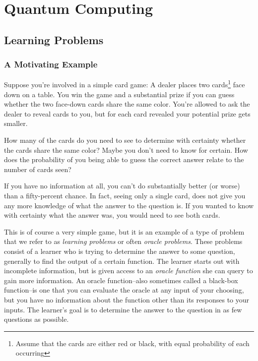 \chapter{Quantum Computing}

\section{Learning Problems}

\subsection{A Motivating Example}


        Suppose you're involved in a simple card game: A dealer places two cards\footnote{Assume that the cards are
        either red or black, with equal probability of each occurring}  face down on a table. You win the game and a
        substantial prize if you can guess whether the two face-down cards share the same color. You're allowed to
        ask the dealer to reveal cards to you, but for each card revealed your potential prize gets smaller.

        How many of the cards do you need to see to determine with certainty whether the cards share the same
        color?  Maybe you don't need to know for certain. How does the probability of you being able to guess the
        correct answer relate to the number of cards seen?


        If you have no information at all, you can't do substantially better (or worse) than a fifty-percent
        chance. In fact, seeing only a single card, does not give you any more knowledge of what the answer to the
        question is. If you wanted to know with certainty what the answer was, you would need to see both cards.


        This is of course a very simple game, but it is an example of a type of problem that we refer to as
        \emph{learning problems} or often \emph{oracle problems}. These problems consist of a learner who is trying
        to determine the answer to some question, generally to find the output of a certain function. The learner
        starts out with incomplete information, but is given access to an \emph{oracle function} she can query to
        gain more information. An oracle function--also sometimes called a black-box function--is one that you can
        evaluate the oracle at any input of your choosing, but you have no information about the function other
        than its responses to your inputs. The learner's goal is to determine the answer to the question in as few
        questions as possible. 

